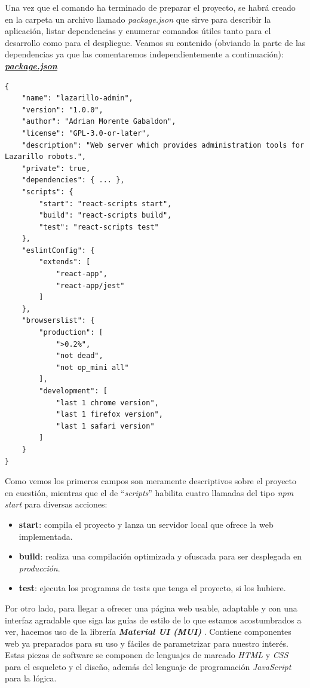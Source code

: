 Una vez que el comando ha terminado de preparar el proyecto, se habrá creado en la carpeta un archivo llamado \emph{package.json} que sirve para describir la aplicación, listar dependencias y enumerar comandos útiles tanto para el desarrollo como para el despliegue. Veamos su contenido (obviando la parte de las dependencias ya que las comentaremos independientemente a continuación):\\

\textbf{\textit{\href{https://github.com/adrianmorente/lazarillo-admin-frontend/blob/main/package.json}{package.json}}}
\begin{lstlisting}
{
	"name": "lazarillo-admin",
	"version": "1.0.0",
	"author": "Adrian Morente Gabaldon",
	"license": "GPL-3.0-or-later",
	"description": "Web server which provides administration tools for Lazarillo robots.",
	"private": true,
	"dependencies": { ... },
	"scripts": {
		"start": "react-scripts start",
		"build": "react-scripts build",
		"test": "react-scripts test"
	},
	"eslintConfig": {
		"extends": [
			"react-app",
			"react-app/jest"
		]
	},
	"browserslist": {
		"production": [
			">0.2%",
			"not dead",
			"not op_mini all"
		],
		"development": [
			"last 1 chrome version",
			"last 1 firefox version",
			"last 1 safari version"
		]
	}
}
\end{lstlisting}

Como vemos los primeros campos son meramente descriptivos sobre el proyecto en cuestión, mientras que el de ``\textit{scripts}'' habilita cuatro llamadas del tipo \emph{npm start} para diversas acciones:

\begin{itemize}
	\item \textbf{start}: compila el proyecto y lanza un servidor local que ofrece la web implementada.
	\item \textbf{build}: realiza una compilación optimizada y ofuscada para ser desplegada en \textit{producción}.
	\item \textbf{test}: ejecuta los programas de tests que tenga el proyecto, si los hubiere.
\end{itemize}

Por otro lado, para llegar a ofrecer una página web usable, adaptable y con una interfaz agradable que siga las guías de estilo de lo que estamos acostumbrados a ver, hacemos uso de la librería \textbf{\textit{Material UI (MUI)}} \cite{material-ui}. Contiene componentes web ya preparados para su uso y fáciles de parametrizar para nuestro interés. Estas piezas de software se componen de lenguajes de marcado \textit{HTML} y \textit{CSS} para el esqueleto y el diseño, además del lenguaje de programación \textit{JavaScript} para la lógica.\\


